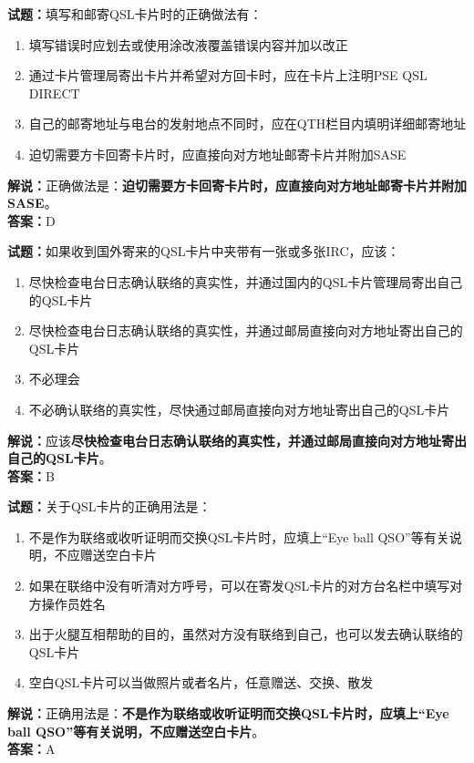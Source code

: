 \documentclass{ctexbook}
\begin{document}
\vspace{1em}

\textbf{试题：}填写和邮寄QSL卡片时的正确做法有：
\begin{enumerate}[leftmargin=3em]
  \item 填写错误时应划去或使用涂改液覆盖错误内容并加以改正
  \item 通过卡片管理局寄出卡片并希望对方回卡时，应在卡片上注明PSE QSL DIRECT
  \item 自己的邮寄地址与电台的发射地点不同时，应在QTH栏目内填明详细邮寄地址
  \item 迫切需要方卡回寄卡片时，应直接向对方地址邮寄卡片并附加SASE
\end{enumerate}
\noindent\textbf{解说：}正确做法是：\textbf{迫切需要方卡回寄卡片时，应直接向对方地址邮寄卡片并附加SASE}。\\\noindent\textbf{答案：}D

\vspace{1em}

\textbf{试题：}如果收到国外寄来的QSL卡片中夹带有一张或多张IRC，应该：
\begin{enumerate}[leftmargin=3em]
  \item 尽快检查电台日志确认联络的真实性，并通过国内的QSL卡片管理局寄出自己的QSL卡片
  \item 尽快检查电台日志确认联络的真实性，并通过邮局直接向对方地址寄出自己的QSL卡片
  \item 不必理会
  \item 不必确认联络的真实性，尽快通过邮局直接向对方地址寄出自己的QSL卡片
\end{enumerate}
\noindent\textbf{解说：}应该\textbf{尽快检查电台日志确认联络的真实性，并通过邮局直接向对方地址寄出自己的QSL卡片}。\\\noindent\textbf{答案：}B

\vspace{1em}

\textbf{试题：}关于QSL卡片的正确用法是：
\begin{enumerate}[leftmargin=3em]
  \item 不是作为联络或收听证明而交换QSL卡片时，应填上“Eye ball QSO”等有关说明，不应赠送空白卡片
  \item 如果在联络中没有听清对方呼号，可以在寄发QSL卡片的对方台名栏中填写对方操作员姓名
  \item 出于火腿互相帮助的目的，虽然对方没有联络到自己，也可以发去确认联络的QSL卡片
  \item 空白QSL卡片可以当做照片或者名片，任意赠送、交换、散发
\end{enumerate}
\noindent\textbf{解说：}正确用法是：\textbf{不是作为联络或收听证明而交换QSL卡片时，应填上“Eye ball QSO”等有关说明，不应赠送空白卡片}。\\\noindent\textbf{答案：}A
\end{document}
